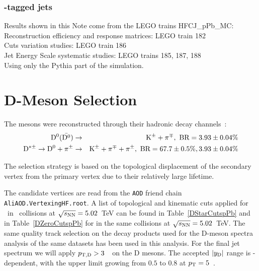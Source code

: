 \subsubsection{\Dzero-tagged jets}
Results shown in this Note come from the LEGO trains HFCJ\_pPb\_MC:  
\\Reconstruction efficiency and response matrices: LEGO train 182
\\Cuts variation studies: LEGO train 186
\\Jet Energy Scale systematic studies: LEGO trains 185, 187, 188
\\Using only the Pythia part of the simulation.


\section{D-Meson Selection}
\label{sec:DmesonSel}
The \Dstar mesons were reconstructed through their hadronic decay channels~\cite{PDG:2016}:
\begin{eqnarray*}
\mathrm{D^{0}} (\bar{\mathrm{D^{0}}}) &\to& {\rm K}^{\pm} + \pi^{\mp}  , {\text{ BR}} = 3.93\pm0.04\%\\
\mathrm{D^{*\pm}} \to \mathrm{D^{0}} + \pi^{\pm} &\to& {\rm K}^{\pm} + \pi^{\mp}  + \pi^{\pm} , {\text{ BR}} = 67.7\pm0.5\%, 3.93\pm0.04\%
\end{eqnarray*}

The selection strategy is based on the topological displacement of the secondary vertex from the primary vertex due to their relatively large lifetime.

The candidate vertices are read from the \texttt{AOD} friend chain \texttt{AliAOD.VertexingHF.root}. A list of topological and kinematic cuts applied for \Dstar\ in \pPb\ collisions at $\sqrt{s_{\rm NN}}=5.02$~TeV can be found in Table~\ref{DStarCutspPb} and in Table~\ref{DZeroCutspPb} for \Dzero in the same \pPb collisions at $\sqrt{s_{\rm NN}}=5.02$~TeV.
The same quality track selection on the decay products used for the D-meson spectra analysis of the same datasets has been used in this analysis.
For the final jet spectrum we will apply $p_{\mathrm{T,D}}> 3$~\GeVc\ on the D mesons. The accepted $|y_{\rm D}|$ range is \pt-dependent, with the upper limit growing from $0.5$ to $0.8$ at $p_{\rm T}=5$~\GeVc.

